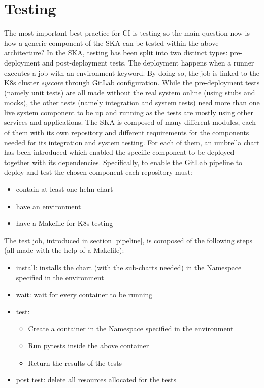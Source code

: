 \documentclass[a4paper]{spie}  %
\begin{document}
\section{Testing}
The most important best practice for CI is testing so the main question now is how a generic component of the SKA can be tested within the above architecture?
In the SKA, testing has been split into two distinct types: pre-deployment and post-deployment tests. The deployment happens when a runner executes a job with an environment keyword. By doing so, the job is linked to the K8s cluster \textit{syscore} through GitLab configuration.
While the pre-deployment tests (namely unit tests) are all made without the real system online (using stubs and mocks), the other tests (namely integration and system tests) need more than one live system component to be up and running as the tests are mostly using other services and applications.
The SKA is composed of many different modules, each of them with its own repository and different requirements for the components needed for its integration and system testing. For each of them, an umbrella chart has been introduced which enabled the specific component to be deployed together with its dependencies.
Specifically, to enable the GitLab pipeline to deploy and test the chosen component each repository must:
\begin{itemize}
    \item contain at least one helm chart
    \item have an environment
    \item have a Makefile for K8s testing
\end{itemize}

The test job, introduced in section \ref{pipeline}, is composed of the following steps (all made with the help of a Makefile):
\begin{itemize}
    \item install: installs the chart (with the sub-charts needed) in the Namespace specified in the environment
    \item wait: wait for every container to be running
    \item test:
    \begin{itemize}
        \item Create a container in the Namespace specified in the environment
        \item Run pytests inside the above container
        \item Return the results of the tests
    \end{itemize}
    \item post test: delete all resources allocated for the tests
\end{itemize}
\end{document}
